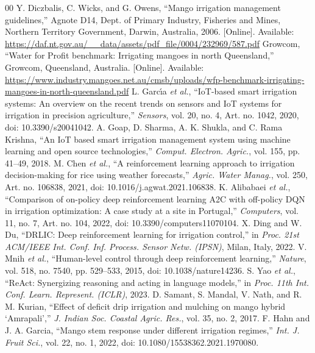 \documentclass[conference]{IEEEtran}
\begin{document}
\begin{thebibliography}{00}
 Y. Diczbalis, C. Wicks, and G. Owens, ``Mango irrigation management guidelines,'' Agnote D14, Dept. of Primary Industry, Fisheries and Mines, Northern Territory Government, Darwin, Australia, 2006. [Online]. Available: \url{https://daf.nt.gov.au/__data/assets/pdf_file/0004/232969/587.pdf}
 Growcom, ``Water for Profit benchmark: Irrigating mangoes in north Queensland,'' Growcom, Queensland, Australia. [Online]. Available: \url{https://www.industry.mangoes.net.au/cmsb/uploads/wfp-benchmark-irrigating-mangoes-in-north-queensland.pdf}
 L. Garc\'{\i}a \textit{et al.}, ``IoT-based smart irrigation systems: An overview on the recent trends on sensors and IoT systems for irrigation in precision agriculture,'' \textit{Sensors}, vol. 20, no. 4, Art. no. 1042, 2020, doi: 10.3390/s20041042.
 A. Goap, D. Sharma, A. K. Shukla, and C. Rama Krishna, ``An IoT based smart irrigation management system using machine learning and open source technologies,'' \textit{Comput. Electron. Agric.}, vol. 155, pp. 41--49, 2018.
 M. Chen \textit{et al.}, ``A reinforcement learning approach to irrigation decision-making for rice using weather forecasts,'' \textit{Agric. Water Manag.}, vol. 250, Art. no. 106838, 2021, doi: 10.1016/j.agwat.2021.106838.
 K. Alibabaei \textit{et al.}, ``Comparison of on-policy deep reinforcement learning A2C with off-policy DQN in irrigation optimization: A case study at a site in Portugal,'' \textit{Computers}, vol. 11, no. 7, Art. no. 104, 2022, doi: 10.3390/computers11070104.
 X. Ding and W. Du, ``DRLIC: Deep reinforcement learning for irrigation control,'' in \textit{Proc. 21st ACM/IEEE Int. Conf. Inf. Process. Sensor Netw. (IPSN)}, Milan, Italy, 2022.
 V. Mnih \textit{et al.}, ``Human-level control through deep reinforcement learning,'' \textit{Nature}, vol. 518, no. 7540, pp. 529--533, 2015, doi: 10.1038/nature14236.
 S. Yao \textit{et al.}, ``ReAct: Synergizing reasoning and acting in language models,'' in \textit{Proc. 11th Int. Conf. Learn. Represent. (ICLR)}, 2023.
 D. Samant, S. Mandal, V. Nath, and R. M. Kurian, ``Effect of deficit drip irrigation and mulching on mango hybrid `Amrapali','' \textit{J. Indian Soc. Coastal Agric. Res.}, vol. 35, no. 2, 2017.
 F. Hahn and J. A. Garcia, ``Mango stem response under different irrigation regimes,'' \textit{Int. J. Fruit Sci.}, vol. 22, no. 1, 2022, doi: 10.1080/15538362.2021.1970080.

\end{thebibliography}
\end{document}
